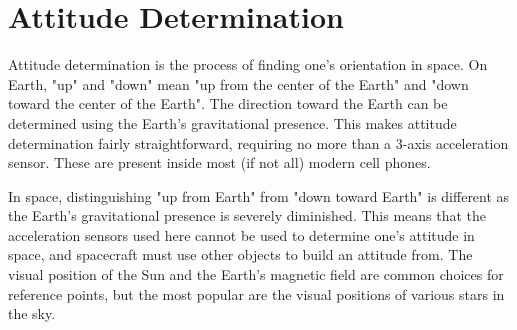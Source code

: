 \section{Attitude Determination}\label{sec:attitudeDetermination}
\begin{figure}
\end{figure}

Attitude determination is the process of finding one's orientation in space.
On Earth, "up" and "down" mean "up from the center of the Earth" and "down toward the center of the Earth".
The direction toward the Earth can be determined using the Earth's gravitational presence.
This makes attitude determination fairly straightforward, requiring no more than a 3-axis acceleration sensor.
These are present inside most (if not all) modern cell phones.

In space, distinguishing "up from Earth" from "down toward Earth" is different as the Earth's gravitational presence is
severely diminished.
This means that the acceleration sensors used here cannot be used to determine one's attitude in space, and
spacecraft must use other objects to build an attitude from.
The visual position of the Sun and the Earth's magnetic field are common choices for reference points, but the most
popular are the visual positions of various stars in the sky.

